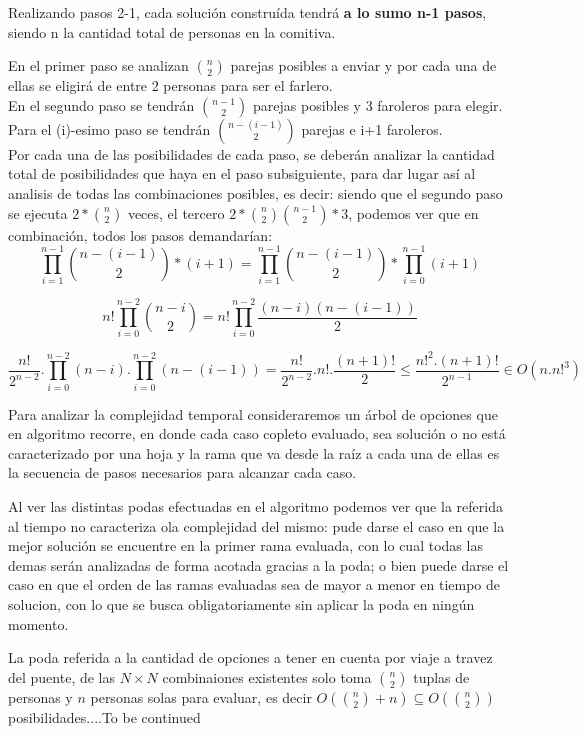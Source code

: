 \vspace*{1em}

Realizando pasos 2-1, cada solución construída tendrá {\bf a lo sumo n-1 pasos}, siendo n la cantidad total de personas en la comitiva.

En el primer paso se analizan $\binom {n}{2}$ parejas posibles a enviar y por cada una de ellas se eligirá de entre 2 personas para ser el farlero.\\

En el segundo paso se tendr\'an $\binom {n-1}{2}$ parejas posibles y 3 faroleros para elegir.\\

Para el (i)-esimo paso se tendrán $\binom {n-(i-1)}{2}$ parejas e i+1 faroleros.\\

Por cada una de las posibilidades de cada paso, se deber\'an analizar la cantidad total de
posibilidades que haya en el paso subsiguiente, para dar lugar as\'i al analisis de todas las combinaciones posibles, es decir: siendo que el segundo paso se ejecuta $2 \ast \binom {n}{2}$ veces, el tercero $2 \ast \binom {n}{2} \binom{n-1} {2} \ast 3$, podemos ver que en combinación, todos los pasos demandarían:
\[
\prod_{i=1}^{n-1}\binom {n-(i-1)}{2}*(i+1) = \prod_{i=1}^{n-1}\binom {n-(i-1)}{2} * \prod_{i=0}^{n-1}(i+1)
\]

\[
n!\prod_{i=0}^{n-2}\binom {n-i}{2} = n!\prod_{i=0}^{n-2}\frac{(n-i)(n-(i-1))}{2}
\]

\[
\frac{ n!}{2^{n-2}}.\prod_{i=0}^{n-2}(n-i).\prod_{i=0}^{n-2}(n-(i-1)) = \frac{n!}{2^{n-2}}.n!.\frac{(n+1)!}{2}\leq \frac{n!^{2}.(n+1)!}{2^{n-1}}\in O(n.n!^{3})
\]

Para analizar la complejidad temporal consideraremos un árbol de opciones que en algoritmo recorre, en donde cada caso copleto evaluado, sea solución o no está caracterizado por una hoja y la rama que va desde la raíz a cada una de ellas es la secuencia de pasos necesarios para alcanzar cada caso.

Al ver las distintas podas efectuadas en el algoritmo podemos ver que la referida al tiempo no caracteriza ola complejidad del mismo: pude darse el caso en que la mejor solución se encuentre en la primer rama evaluada, con lo cual todas las demas serán analizadas de forma acotada gracias a la poda; o bien puede darse el caso en que el orden de las ramas evaluadas sea de mayor a menor en tiempo de solucion, con lo que se busca obligatoriamente sin aplicar la poda en ningún momento.

La poda referida a la cantidad de opciones a tener en cuenta por viaje a travez del puente, de las $N \times N$ combinaiones existentes solo toma $\binom {n}{2}$ tuplas de personas y $n$ personas solas para evaluar, es decir $O(\binom {n}{2} + n) \subseteq O(\binom {n}{2})$ posibilidades....To be continued